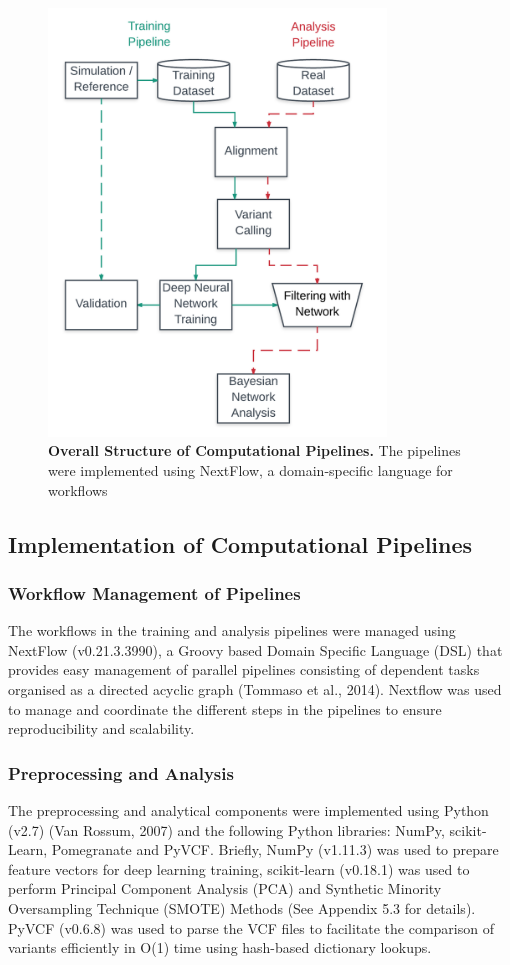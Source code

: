 \documentclass{article}
\begin{document}
\begin{figure}[H]
\includegraphics[width=0.8\textwidth]{trainingpathway.png}
\centering
\caption{\textbf{Overall Structure of Computational Pipelines.} The pipelines were implemented using NextFlow, a domain-specific language for workflows}
\end{figure}
\subsection{Implementation of Computational Pipelines}
\subsubsection{Workflow Management of Pipelines}
The workflows in the training and analysis pipelines were managed using NextFlow (v0.21.3.3990), a Groovy based Domain Specific Language (DSL) that provides easy management of parallel pipelines consisting of dependent tasks organised as a directed acyclic graph (Tommaso et al., 2014). Nextflow was used to manage and coordinate the different steps in the pipelines to ensure reproducibility and scalability.
\subsubsection{Preprocessing and Analysis}
The preprocessing and analytical components were implemented using Python (v2.7) (Van Rossum, 2007) and the following Python libraries: NumPy, scikit-Learn, Pomegranate and PyVCF. Briefly, NumPy (v1.11.3) was used to prepare feature vectors for deep learning training, scikit-learn (v0.18.1) was used to perform Principal Component Analysis (PCA) and Synthetic Minority Oversampling Technique (SMOTE) Methods (See Appendix 5.3 for details). PyVCF (v0.6.8) was used to parse the VCF files to facilitate the comparison of variants efficiently in O(1) time using hash-based dictionary lookups. 
\end{document}
